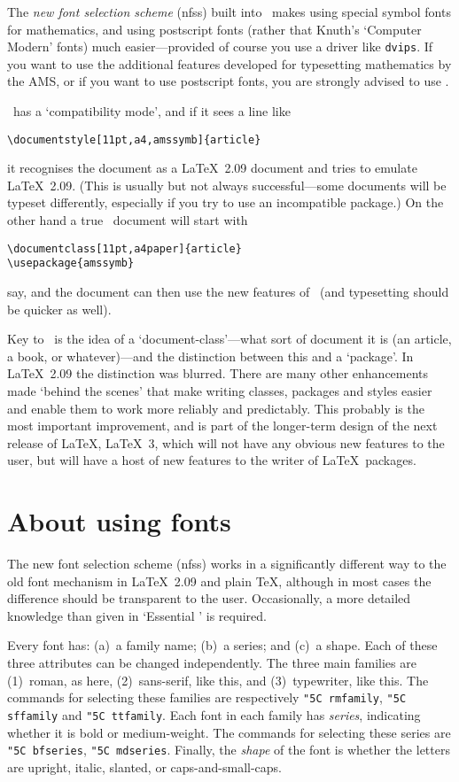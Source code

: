 \documentclass[11pt,a4paper]{article}
\newcommand{\fn}[1]{{\tt #1}}
\newcommand{\cn}[1]{{\tt \char"5C #1}}
\begin{document}
The {\it new font selection scheme\/} (nfss) built into \LaTeXe\ makes
using special symbol fonts for mathematics, and using postscript fonts 
(rather that Knuth's `Computer Modern' fonts) much easier---provided 
of course you use a driver like \fn{dvips}. If you
want to use the additional features developed for typesetting mathematics
by the AMS, or if you want to use postscript fonts, you are strongly 
advised to use \LaTeXe.

\LaTeXe\ has a `compatibility mode', and if it sees a line like
\begin{verbatim}
\documentstyle[11pt,a4,amssymb]{article} 
\end{verbatim}
it recognises the document as a \LaTeX~2.09 document and tries
to emulate \LaTeX~2.09.  (This is usually but not always 
successful---some documents will be typeset differently, especially 
if you try to use an incompatible package.)  On the other hand a true
\LaTeXe\ document will start with
\begin{verbatim}
\documentclass[11pt,a4paper]{article}
\usepackage{amssymb}
\end{verbatim}
say, and the document can then use the new features of 
\LaTeXe\ (and typesetting should be quicker as well).

Key to \LaTeXe\ is the idea of a `document-class'---what sort of document 
it is (an article, a book, or whatever)---and the distinction between this
and a `package'.  In \LaTeX~2.09 the distinction was blurred.
There are many other enhancements made `behind the scenes' that make
writing classes, packages and styles easier and enable them to 
work more reliably and predictably.  This probably is the most important
improvement, and is part of the longer-term design of the next release
of \LaTeX, \LaTeX~3, which will not have any obvious new features
to the user, but will have a host of new features to the writer of \LaTeX\
packages.

\section{About using fonts}

The new font selection scheme (nfss) works in a significantly different
way to the old font mechanism in \LaTeX~2.09 and plain \TeX,
although in most cases the difference should be transparent to the
user.  Occasionally, a more detailed knowledge than given in 
`Essential \LaTeXe' is required.

Every font has: (a)~a family name; (b)~a series; and (c)~a shape.  
Each of these three attributes can be changed independently.  
The three main families are (1)~roman, as here, (2)~sans-serif, 
{\sffamily like this}, and (3)~typewriter, {\ttfamily like this}.  
The commands for selecting
these families are respectively \cn{rmfamily}, \cn{sffamily}
and \cn{ttfamily}.  Each font in each family has {\it series}, indicating
whether it is bold or medium-weight.
The commands for selecting
these series are  \cn{bfseries}, \cn{mdseries}.  Finally, the {\it
shape} of the font is whether the letters are upright,
italic, slanted, or caps-and-small-caps.
\end{document}
